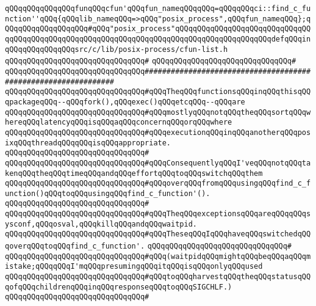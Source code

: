 \verb|qQQqqQQqqQQqqQQqfunqQQqcfun'qQQqfun_nameqQQqqQQq=qQQqqQQqci::find_c_function''qQQq{qQQqlib_nameqQQq=>qQQq"posix_process",qQQqfun_nameqQQq};qQQqqQQqqQQqqQQqqQQq#qQQq"posix_process"qQQqqQQqqQQqqQQqqQQqqQQqqQQqqQQqqQQqqQQqqQQqqQQqqQQqqQQqqQQqqQQqqQQqqQQqqQQqqQQqqQQqqQQqqQQqdefqQQqinqQQqqQQqqQQqqQQqsrc/c/lib/posix-process/cfun-list.h|\newline
\verb|qQQqqQQqqQQqqQQqqQQqqQQqqQQqqQQq#|\newline
\verb|qQQqqQQqqQQqqQQqqQQqqQQqqQQqqQQq#|\newline
\verb|qQQqqQQqqQQqqQQqqQQqqQQqqQQqqQQq###############################################################|\newline
\verb|qQQqqQQqqQQqqQQqqQQqqQQqqQQqqQQq#qQQqTheqQQqfunctionsqQQqinqQQqthisqQQqpackageqQQq--qQQqfork(),qQQqexec()qQQqetcqQQq--qQQqare|\newline
\verb|qQQqqQQqqQQqqQQqqQQqqQQqqQQqqQQq#qQQqmostlyqQQqnotqQQqtheqQQqsortqQQqwhereqQQqlatencyqQQqisqQQqaqQQqconcernqQQqorqQQqwhere|\newline
\verb|qQQqqQQqqQQqqQQqqQQqqQQqqQQqqQQq#qQQqexecutionqQQqinqQQqanotherqQQqposixqQQqthreadqQQqqQQqisqQQqappropriate.|\newline
\verb|qQQqqQQqqQQqqQQqqQQqqQQqqQQqqQQq#|\newline
\verb|qQQqqQQqqQQqqQQqqQQqqQQqqQQqqQQq#qQQqConsequentlyqQQqI'veqQQqnotqQQqtakenqQQqtheqQQqtimeqQQqandqQQqeffortqQQqtoqQQqswitchqQQqthem|\newline
\verb|qQQqqQQqqQQqqQQqqQQqqQQqqQQqqQQq#qQQqoverqQQqfromqQQqusingqQQqfind_c_function()qQQqtoqQQqusingqQQqfind_c_function'().|\newline
\verb|qQQqqQQqqQQqqQQqqQQqqQQqqQQqqQQq#|\newline
\verb|qQQqqQQqqQQqqQQqqQQqqQQqqQQqqQQq#qQQqTheqQQqexceptionsqQQqareqQQqqQQqsysconf,qQQqosval,qQQqkillqQQqandqQQqwaitpid.|\newline
\verb|qQQqqQQqqQQqqQQqqQQqqQQqqQQqqQQq#qQQqTheseqQQqIqQQqhaveqQQqswitchedqQQqoverqQQqtoqQQqfind_c_function'.|\newline
\verb|qQQqqQQqqQQqqQQqqQQqqQQqqQQqqQQq#|\newline
\verb|qQQqqQQqqQQqqQQqqQQqqQQqqQQqqQQq#qQQq(waitpidqQQqmightqQQqbeqQQqaqQQqmistake;qQQqqQQqI'mqQQqpresumingqQQqitqQQqisqQQqonlyqQQqused|\newline
\verb|qQQqqQQqqQQqqQQqqQQqqQQqqQQqqQQq#qQQqtoqQQqharvestqQQqtheqQQqstatusqQQqofqQQqchildrenqQQqinqQQqresponseqQQqtoqQQqSIGCHLF.)|\newline
\verb|qQQqqQQqqQQqqQQqqQQqqQQqqQQqqQQq#|\newline
